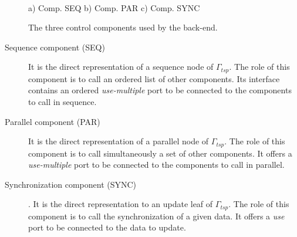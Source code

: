 \begin{figure}[t]
\hspace{\fill}
\hspace{\fill}
\\
a) Comp. SEQ
\hspace{\fill}
b) Comp. PAR
\hspace{\fill}
c) Comp. SYNC
\\
\caption{The three control components used by the back-end.}
\label{fig:ctrlcomponents}
\end{figure}

\begin{description}
\item[Sequence component (SEQ)] It is the direct representation of a sequence node of $\Gamma_{tsp}$. The role of this component is to call an ordered list of other components. Its interface contains an ordered \emph{use-multiple} port to be connected to the components to call in sequence.

\item[Parallel component (PAR)] It is the direct representation of a parallel node of $\Gamma_{tsp}$. The role of this component is to call simultaneously a set of other components. It offers a \emph{use-multiple} port to be connected to the components to call in parallel.
  
\item[Synchronization component (SYNC)]. It is the direct representation to an update leaf of $\Gamma_{tsp}$. The role of this component is to call the synchronization of a given data. It offers a \emph{use} port to be connected to the data to update.

\end{description}


